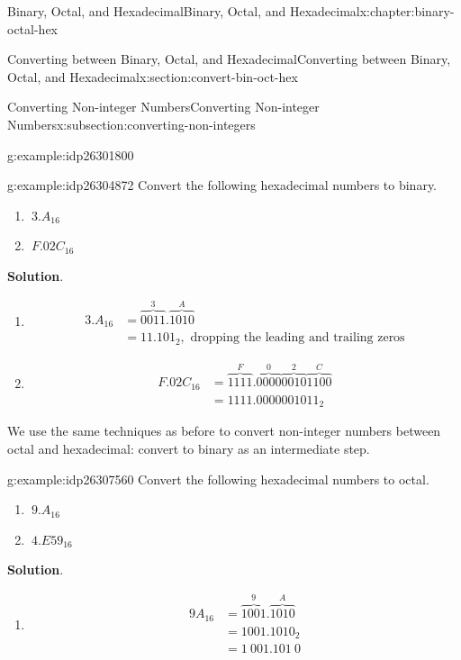 \documentclass[twoside,10pt,]{book}
\newcommand{\blocktitlefont}{\relax}
\numberwithin{equation}{section}
\newcommand{\amp}{&}
\begin{document}
\begin{chapterptx}{Binary, Octal, and Hexadecimal}{}{Binary, Octal, and Hexadecimal}{}{}{x:chapter:binary-octal-hex}
\begin{sectionptx}{Converting between Binary, Octal, and Hexadecimal}{}{Converting between Binary, Octal, and Hexadecimal}{}{}{x:section:convert-bin-oct-hex}
\begin{subsectionptx}{Converting Non-integer Numbers}{}{Converting Non-integer Numbers}{}{}{x:subsection:converting-non-integers}
\begin{example}{}{g:example:idp26301800}
\begin{enumerate}
\end{enumerate}
\end{example}
\begin{example}{}{g:example:idp26304872}%
Convert the following hexadecimal numbers to binary. %
\begin{enumerate}
\item{}\(\displaystyle \ 3.A_{16}\)%
\item{}\(\displaystyle \ F.02C_{16}\)%
\end{enumerate}
\par\smallskip%
\noindent\textbf{\blocktitlefont Solution}.\label{g:solution:idp26306280}{}\hypertarget{g:solution:idp26306280}{}\quad{}%
\begin{enumerate}
\item{}%
\begin{align*}
3.A_{16} \amp = \overbrace{0011}^3.\overbrace{1010}^A\\
\amp = 11.101_2,\text{ dropping the leading and trailing zeros}
\end{align*}
%
\item{}%
\begin{align*}
F.02C_{16} \amp = \overbrace{1111}^F.\overbrace{0000}^0\overbrace{0010}^2\overbrace{1100}^C\\
\amp = 1111.0000 0010 11_2
\end{align*}
%
\end{enumerate}
\end{example}
We use the same techniques as before to convert non-integer numbers between octal and hexadecimal: convert to binary as an intermediate step.%
\begin{example}{}{g:example:idp26307560}%
Convert the following hexadecimal numbers to octal. %
\begin{enumerate}
\item{}\(\displaystyle \ 9.A_{16}\)%
\item{}\(\displaystyle \ 4.E59_{16}\)%
\end{enumerate}
\par\smallskip%
\noindent\textbf{\blocktitlefont Solution}.\label{g:solution:idp26317928}{}\hypertarget{g:solution:idp26317928}{}\quad{}%
\begin{enumerate}
\item{}%
\begin{align*}
9A_{16} \amp = \overbrace{1001}^9.\overbrace{1010}^A\\
\amp = 1001.1010_2\\
\amp = 1\ 001.101\ 0\\

\end{align*}
\end{enumerate}
\end{example}
\end{subsectionptx}
\end{sectionptx}
\end{chapterptx}
\end{document}
